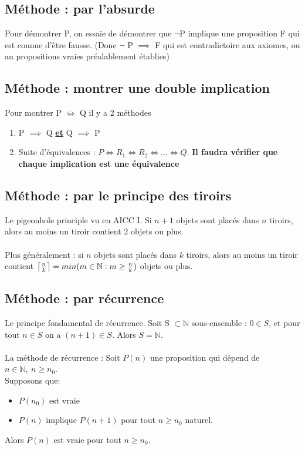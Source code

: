 \documentclass{article}
\DeclarePairedDelimiter\ceil{\lceil}{\rceil}
\begin{document}
\subsection{Méthode : par l'absurde}
Pour démontrer P, on essaie de démontrer que $\neg$P implique une proposition F qui est connue d'être fausse. (Donc $\neg$ P $\implies$ F qui est contradictoire aux axiomes, ou au propositions vraies préalablement établies)
\subsection{Méthode : montrer une double implication}
Pour montrer P  $\iff$ Q il y a 2 méthodes
\begin{enumerate}
    \item P $\implies$ Q \underline{\textbf{et}} Q $\implies$ P
    \item Suite d'équivalences :  $P \iff R_1 \iff R_2 \iff ... \iff Q$. \textbf{Il faudra vérifier que chaque implication est une équivalence} 
\end{enumerate}

\subsection{Méthode : par le principe des tiroirs}

Le pigeonhole principle vu en AICC I. Si $ n + 1 $ objets sont placés dans $ n $ tiroirs, alors au moins un tiroir contient 2 objets ou plus.\\\\
Plus généralement : si $ n $ objets sont placés dans $ k $ tiroirs, alors au moins un tiroir contient $ \ceil*{\frac{n}{k}} = min( m \in \mathbb{N} : m \geq \frac{n}{k}) $ objets ou plus.

\subsection{Méthode : par récurrence}

Le principe fondamental de récurrence. Soit S $ \subset \mathbb{N} $ sous-ensemble : $ 0 \in S $, et pour tout $ n \in S $ on a $ (n+1) \in S $. Alors $ S = \mathbb{N} $.\\\\
La méthode de récurrence : Soit $ P(n) $ une proposition qui dépend de $ n \in \mathbb{N},\ n \geq n_0 $.\\ Supposons que:
\begin{itemize}
    \item $P(n_0)$ est vraie
    \item $ P(n) $ implique $ P(n+1) $ pour tout $ n \geq n_0 $ naturel.
\end{itemize}
Alors $ P(n) $ est vraie pour tout $ n \geq n_0 $.\\\\
\end{document}
